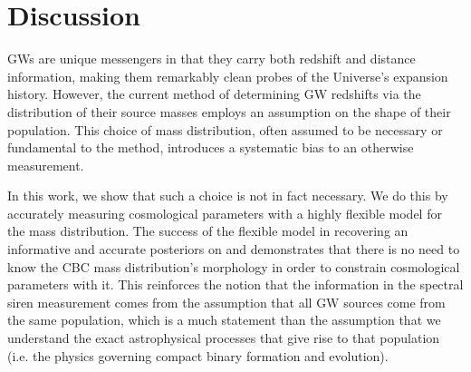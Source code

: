 \documentclass[]{aastex631}
\begin{document}

\section{Discussion}
\label{sec:discussion}

\acp{GW} are unique messengers in that they carry both redshift and distance information, making them remarkably clean probes of the Universe's expansion history. 
However, the current method of determining \ac{GW} redshifts via the distribution of their source masses employs an assumption on the shape of their population.
This choice of mass distribution, often assumed to be necessary or fundamental to the method, introduces a systematic bias to an otherwise  measurement.
    
In this work, we show that such a choice is not in fact necessary.
We do this by accurately measuring cosmological parameters with a highly flexible model for the mass distribution. 
The success of the flexible model in recovering an informative and accurate posteriors on \Ho{} and \Omm{} demonstrates that there is no need to know the \ac{CBC} mass distribution's morphology in order to constrain cosmological parameters with it.
This reinforces the notion that the information in the spectral siren measurement comes from the assumption that all \ac{GW} sources come from the same population, which is a much  statement than the assumption that we understand the exact astrophysical processes that give rise to that population (i.e. the physics governing compact binary formation and evolution).
    
\end{document}
